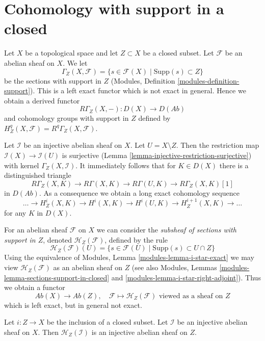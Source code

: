 \section{Cohomology with support in a closed}
\label{section-cohomology-support}

\noindent
Let $X$ be a topological space and let $Z \subset X$ be a closed subset.
Let $\mathcal{F}$ be an abelian sheaf on $X$. We let
$$
\Gamma_Z(X, \mathcal{F}) =
\{s \in \mathcal{F}(X) \mid \text{Supp}(s) \subset Z\}
$$
be the sections with support in $Z$
(Modules, Definition \ref{modules-definition-support}).
This is a left exact functor which is not exact in general.
Hence we obtain a derived functor
$$
R\Gamma_Z(X, -) : D(X) \longrightarrow D(\textit{Ab})
$$
and cohomology groups with support in $Z$ defined by
$H^q_Z(X, \mathcal{F}) = R^q\Gamma_Z(X, \mathcal{F})$.

\medskip\noindent
Let $\mathcal{I}$ be an injective abelian sheaf on $X$. Let
$U = X \setminus Z$. Then the
restriction map $\mathcal{I}(X) \to \mathcal{I}(U)$ is surjective
(Lemma \ref{lemma-injective-restriction-surjective})
with kernel $\Gamma_Z(X, \mathcal{I})$. It immediately follows that
for $K \in D(X)$ there is a distinguished triangle
$$
R\Gamma_Z(X, K) \to R\Gamma(X, K) \to R\Gamma(U, K) \to R\Gamma_Z(X, K)[1]
$$
in $D(\textit{Ab})$. As a consequence we obtain a long exact cohomology
sequence
$$
\ldots \to H^i_Z(X, K) \to H^i(X, K) \to H^i(U, K) \to
H^{i + 1}_Z(X, K) \to \ldots
$$
for any $K$ in $D(X)$.

\medskip\noindent
For an abelian sheaf $\mathcal{F}$ on $X$ we can consider
the {\it subsheaf of sections with support in $Z$}, denoted
$\mathcal{H}_Z(\mathcal{F})$, defined by the rule
$$
\mathcal{H}_Z(\mathcal{F})(U) =
\{s \in \mathcal{F}(U) \mid \text{Supp}(s) \subset U \cap Z\}
$$
Using the equivalence of Modules, Lemma \ref{modules-lemma-i-star-exact}
we may view $\mathcal{H}_Z(\mathcal{F})$ as an abelian sheaf on
$Z$ (see also Modules, Lemmas
\ref{modules-lemma-sections-support-in-closed} and
\ref{modules-lemma-i-star-right-adjoint}).
Thus we obtain a functor
$$
\textit{Ab}(X) \longrightarrow \textit{Ab}(Z),\quad
\mathcal{F} \longmapsto
\mathcal{H}_Z(\mathcal{F})\text{ viewed as a sheaf on }Z
$$
which is left exact, but in general not exact.

\begin{lemma}
\label{lemma-sections-with-support-acyclic}
Let $i : Z \to X$ be the inclusion of a closed subset.
Let $\mathcal{I}$ be an injective abelian sheaf on $X$.
Then $\mathcal{H}_Z(\mathcal{I})$ is an injective abelian sheaf on $Z$.
\end{lemma}

